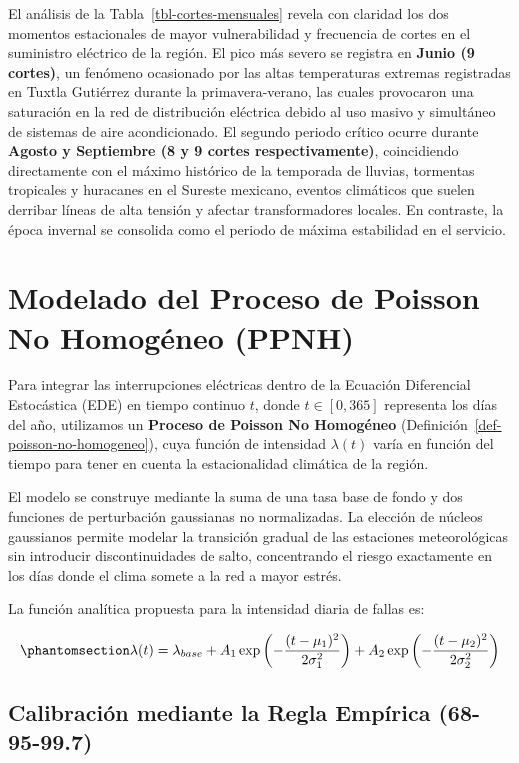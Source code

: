 \documentclass[
  spanish,
  us-letterpaper,
]{scrreprt}
\numberwithin{equation}{section}
\theoremstyle{plain}
\theoremstyle{plain}
\theoremstyle{definition}
\theoremstyle{plain}
\theoremstyle{remark}
\begin{document}
El análisis de la Tabla~\ref{tbl-cortes-mensuales} revela con claridad
los dos momentos estacionales de mayor vulnerabilidad y frecuencia de
cortes en el suministro eléctrico de la región. El pico más severo se
registra en \textbf{Junio (9 cortes)}, un fenómeno ocasionado por las
altas temperaturas extremas registradas en Tuxtla Gutiérrez durante la
primavera-verano, las cuales provocaron una saturación en la red de
distribución eléctrica debido al uso masivo y simultáneo de sistemas de
aire acondicionado. El segundo periodo crítico ocurre durante
\textbf{Agosto y Septiembre (8 y 9 cortes respectivamente)},
coincidiendo directamente con el máximo histórico de la temporada de
lluvias, tormentas tropicales y huracanes en el Sureste mexicano,
eventos climáticos que suelen derribar líneas de alta tensión y afectar
transformadores locales. En contraste, la época invernal se consolida
como el periodo de máxima estabilidad en el servicio.

\section{Modelado del Proceso de Poisson No Homogéneo
(PPNH)}\label{sec-ppnh}

Para integrar las interrupciones eléctricas dentro de la Ecuación
Diferencial Estocástica (EDE) en tiempo continuo \(t\), donde
\(t \in [0, 365]\) representa los días del año, utilizamos un
\textbf{Proceso de Poisson No Homogéneo}
(Definición~\ref{def-poisson-no-homogeneo}), cuya función de intensidad
\(\lambda(t)\) varía en función del tiempo para tener en cuenta la
estacionalidad climática de la región.

El modelo se construye mediante la suma de una tasa base de fondo y dos
funciones de perturbación gaussianas no normalizadas. La elección de
núcleos gaussianos permite modelar la transición gradual de las
estaciones meteorológicas sin introducir discontinuidades de salto,
concentrando el riesgo exactamente en los días donde el clima somete a
la red a mayor estrés.

La función analítica propuesta para la intensidad diaria de fallas es:

\begin{equation}\phantomsection\label{eq-lambda-teorica}{
\lambda(t) = \lambda_{base} + A_1 \exp\left(-\frac{(t - \mu_1)^2}{2\sigma_1^2}\right) + A_2 \exp\left(-\frac{(t - \mu_2)^2}{2\sigma_2^2}\right)
}\end{equation}

\subsection{Calibración mediante la Regla Empírica
(68-95-99.7)}\label{calibraciuxf3n-mediante-la-regla-empuxedrica-68-95-99.7}
\end{document}
